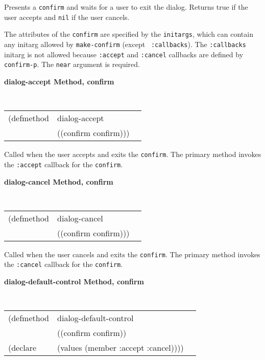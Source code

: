\begin{flushright} \parbox[t]{6.125in}{ Presents a {\tt confirm} and
waits for a user to exit the dialog.  Returns true if the user accepts
and {\tt nil} if the user cancels.  

The attributes of the {\tt confirm} are specified by the {\tt initargs}, which can
contain any initarg allowed by {\tt make-confirm} (except {\tt
:callbacks}). The {\tt :callbacks} initarg is not
allowed because {\tt :accept} and {\tt :cancel} callbacks are defined by {\tt
confirm-p}.  The {\tt near} argument is required.

}\end{flushright}


{\samepage
{\large {\bf dialog-accept \hfill Method, confirm}}
\begin{flushright} \parbox[t]{6.125in}{
\tt
\begin{tabular}{lll}
\raggedright
(defmethod & dialog-accept & \\
& ((confirm  confirm)))
\end{tabular}
\rm

}\end{flushright}}


\begin{flushright} \parbox[t]{6.125in}{Called when the user accepts and exits the
{\tt confirm}. The primary method invokes the {\tt :accept} callback
for the {\tt confirm}.  }\end{flushright}



{\samepage
{\large {\bf dialog-cancel \hfill Method, confirm}}
\begin{flushright} \parbox[t]{6.125in}{
\tt
\begin{tabular}{lll}
\raggedright
(defmethod & dialog-cancel & \\
& ((confirm  confirm)))
\end{tabular}
\rm

}\end{flushright}}


\begin{flushright} \parbox[t]{6.125in}{ Called when the user cancels and exits the
{\tt confirm}. The primary method invokes the {\tt :cancel} callback
for the {\tt confirm}.}\end{flushright}

{\samepage
{\large {\bf dialog-default-control \hfill Method, confirm}}
\begin{flushright} \parbox[t]{6.125in}{
\tt
\begin{tabular}{lll}
\raggedright
(defmethod & dialog-default-control & \\
& ((confirm  confirm))\\
(declare &(values (member :accept :cancel))))
\end{tabular}
\rm

}\end{flushright}}


